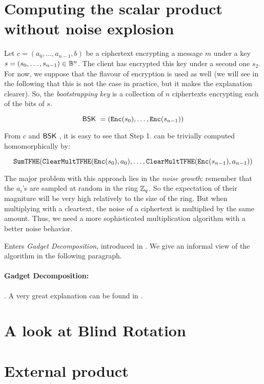 \section{Computing the scalar product without noise explosion}

Let $c = (a_0, \dots, a_{n-1}, b)$ be a \LWE ciphertext encrypting a message $m$ under a key $s = (s_0, \dots, s_{n-1}) \in \mathbb{B}^n$. The client has encrypted this key under a second one $s_2$. For now, we suppose that the \LWE flavour of encryption is used as well (we will see in the following that this is not the case in practice, but it makes the explanation clearer). So, the \textit{bootstrapping key} is a collection of $n$ ciphertexts encrypting each of the bits of $s$.

\begin{equation}
	\textsf{BSK}~ = \left ( \texttt{Enc}(s_0), \dots, \texttt{Enc}(s_{n-1}) \right )
\end{equation}



From $c$ and $\textsf{BSK}~$, it is easy to see that Step 1. can be trivially computed homomorphically by:

\begin{equation*}
	\texttt{SumTFHE}(\texttt{ClearMultTFHE}(\texttt{Enc}(s_0), a_0), \dots, \texttt{ClearMultTFHE}(\texttt{Enc}(s_{n-1}), a_{n-1}))
\end{equation*}


The major problem with this approach lies in the \textit{noise growth}: remember that the $a_i$'s are sampled at random in the ring $\mathbb{Z}_q$. So the expectation of their magniture will be very high relatively to the size of the ring. But when multiplying with a cleartext, the noise of a ciphertext is multiplied by the same amount. Thus, we need a more sophisticated multiplication algorithm with a better noise behavior.

Enters \textit{Gadget Decomposition}, introduced in \cite{}. We give an informal view of the algorithm in the following paragraph.


\paragraph{Gadget Decomposition: }




 . A very great explanation can be found in \cite{}.







\section{A look at Blind Rotation}




\section{External product}


